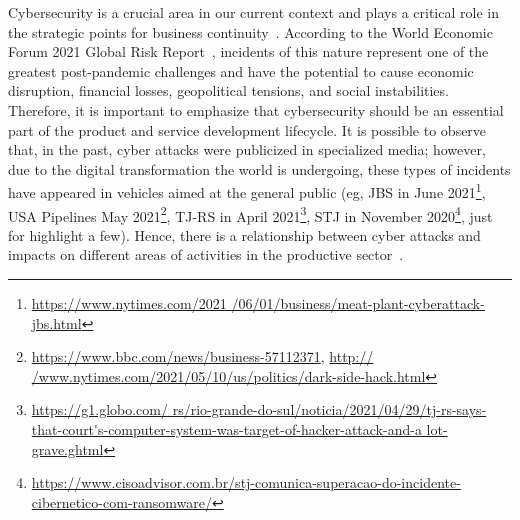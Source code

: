 




Cybersecurity is a crucial area in our current context and plays a critical role in the strategic points for business continuity~\cite{wef}. According to the World Economic Forum 2021 Global Risk Report~\cite{wefrep2021}, incidents of this nature represent one of the greatest post-pandemic challenges and have the potential to cause economic disruption, financial losses, geopolitical tensions, and social instabilities. Therefore, it is important to emphasize that cybersecurity should be an essential part of the product and service development lifecycle. It is possible to observe that, in the past, cyber attacks were publicized in specialized media; however, due to the digital transformation the world is undergoing, these types of incidents have appeared in vehicles aimed at the general public (eg, JBS in June 2021\footnote{\url{https://www.nytimes.com/2021 /06/01/business/meat-plant-cyberattack-jbs.html}}, USA Pipelines May 2021\footnote{\url{https://www.bbc.com/news/business-57112371}, \url{http:// /www.nytimes.com/2021/05/10/us/politics/dark-side-hack.html}}, TJ-RS in April 2021\footnote{\url{https://g1.globo.com/ rs/rio-grande-do-sul/noticia/2021/04/29/tj-rs-says-that-court's-computer-system-was-target-of-hacker-attack-and-a lot- grave.ghtml}}, STJ in November 2020\footnote{\url{https://www.cisoadvisor.com.br/stj-comunica-superacao-do-incidente-cibernetico-com-ransomware/}}, just for highlight a few). Hence, there is a relationship between cyber attacks and impacts on different areas of activities in the productive sector~\cite{costs}.

